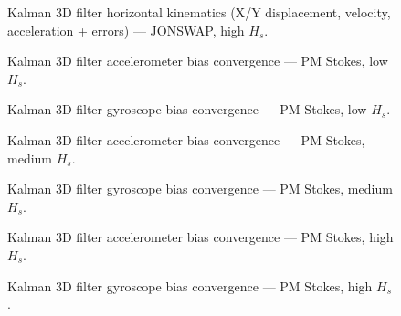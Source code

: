 \documentclass[11pt,letterpaper]{article}
\begin{document}
    \begin{figure}[H]\centering
    \resizebox{\textwidth}{!}{}
    \caption{Kalman 3D filter horizontal kinematics (X/Y displacement, velocity, acceleration + errors) — JONSWAP, high $H_s$.}
    \label{fig:w3d_ou2_jonswap_high_xykin}
    \end{figure}


    \begin{figure}[H]\centering
    \resizebox{\textwidth}{!}{}
    \caption{Kalman 3D filter accelerometer bias convergence — PM Stokes, low $H_s$.}
    \label{fig:w3d_ou2_pmstokes_low_acc_bias}
    \end{figure}

    \begin{figure}[H]\centering
    \resizebox{\textwidth}{!}{}
    \caption{Kalman 3D filter gyroscope bias convergence — PM Stokes, low $H_s$.}
    \label{fig:w3d_ou2_pmstokes_low_gyro_bias}
    \end{figure}

    \begin{figure}[H]\centering
    \resizebox{\textwidth}{!}{}
    \caption{Kalman 3D filter accelerometer bias convergence — PM Stokes, medium $H_s$.}
    \label{fig:w3d_ou2_pmstokes_medium_acc_bias}
    \end{figure}

    \begin{figure}[H]\centering
    \resizebox{\textwidth}{!}{}
    \caption{Kalman 3D filter gyroscope bias convergence — PM Stokes, medium $H_s$.}
    \label{fig:w3d_ou2_pmstokes_medium_gyro_bias}
    \end{figure}

    \begin{figure}[H]\centering
    \resizebox{\textwidth}{!}{}
    \caption{Kalman 3D filter accelerometer bias convergence — PM Stokes, high $H_s$.}
    \label{fig:w3d_ou2_pmstokes_high_acc_bias}
    \end{figure}

    \begin{figure}[H]\centering
    \resizebox{\textwidth}{!}{}
    \caption{Kalman 3D filter gyroscope bias convergence — PM Stokes, high $H_s$.}
    \label{fig:w3d_ou2_pmstokes_high_gyro_bias}
    \end{figure}
\end{document}
